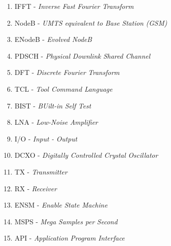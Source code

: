 \begin{enumerate}
	\item IFFT - \textit{Inverse Fast Fourier Transform}
	\item NodeB - \textit{UMTS equivalent to Base Station (GSM)}
	\item ENodeB - \textit{Evolved NodeB}
	\item PDSCH - \textit{Physical Downlink Shared Channel}
	\item DFT - \textit{Discrete Fourier Transform}
	\item TCL - \textit{Tool Command Language}
	\item BIST - \textit{BUilt-in Self Test}
	\item LNA - \textit{Low-Noise Amplifier}
	\item I/O - \textit{Input - Output}
	\item DCXO - \textit{Digitally Controlled Crystal Oscillator}
	\item TX - \textit{Transmitter}
	\item RX - \textit{Receiver}
	\item ENSM - \textit{Enable State Machine}
	\item MSPS - \textit{Mega Samples per Second}
	\item API - \textit{Application Program Interface}
\end{enumerate}
